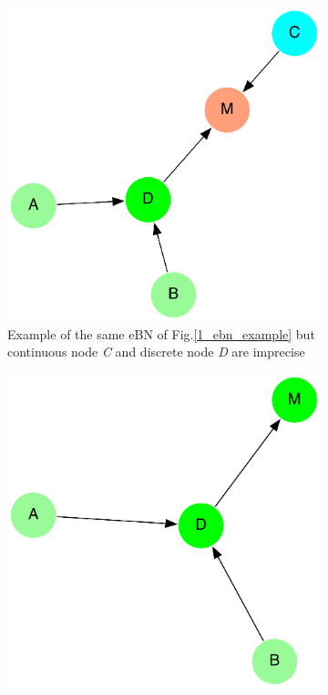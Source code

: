 \begin{figure}[h]
    \centering
    \begin{subfigure}{0.45\textwidth}
        \centering
        \includegraphics[width=\linewidth]{imgs/pdfs/5_imprecise_ebn.pdf}
        \caption{Example of the same eBN of Fig.\ref{1_ebn_example} but continuous node \textit{C} and discrete node \textit{D} are imprecise}\label{1_imp_ebn}
    \end{subfigure}
    \hfill
    \begin{subfigure}{0.45\textwidth}
        \centering
        \includegraphics[width=\linewidth]{imgs/pdfs/6_imprecise_rbn.pdf}

\end{subfigure}
\end{figure}
